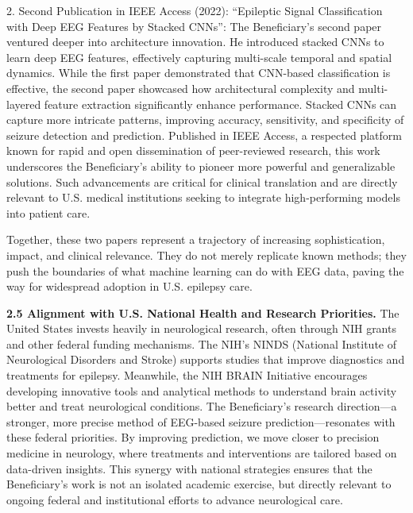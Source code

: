 \documentclass{article}
\begin{document}
2. Second Publication in IEEE Access (2022): “Epileptic Signal Classification with Deep EEG Features by Stacked CNNs”:
The Beneficiary’s second paper ventured deeper into architecture innovation. He introduced stacked CNNs to learn deep EEG features, effectively capturing multi-scale temporal and spatial dynamics. While the first paper demonstrated that CNN-based classification is effective, the second paper showcased how architectural complexity and multi-layered feature extraction significantly enhance performance. Stacked CNNs can capture more intricate patterns, improving accuracy, sensitivity, and specificity of seizure detection and prediction. Published in IEEE Access, a respected platform known for rapid and open dissemination of peer-reviewed research, this work underscores the Beneficiary’s ability to pioneer more powerful and generalizable solutions. Such advancements are critical for clinical translation and are directly relevant to U.S. medical institutions seeking to integrate high-performing models into patient care.

Together, these two papers represent a trajectory of increasing sophistication, impact, and clinical relevance. They do not merely replicate known methods; they push the boundaries of what machine learning can do with EEG data, paving the way for widespread adoption in U.S. epilepsy care.

{\bf 2.5 Alignment with U.S. National Health and Research Priorities. }
The United States invests heavily in neurological research, often through NIH grants and other federal funding mechanisms. The NIH’s NINDS (National Institute of Neurological Disorders and Stroke) supports studies that improve diagnostics and treatments for epilepsy. Meanwhile, the NIH BRAIN Initiative encourages developing innovative tools and analytical methods to understand brain activity better and treat neurological conditions.
The Beneficiary’s research direction—a stronger, more precise method of EEG-based seizure prediction—resonates with these federal priorities. By improving prediction, we move closer to precision medicine in neurology, where treatments and interventions are tailored based on data-driven insights. This synergy with national strategies ensures that the Beneficiary’s work is not an isolated academic exercise, but directly relevant to ongoing federal and institutional efforts to advance neurological care.
\end{document}
